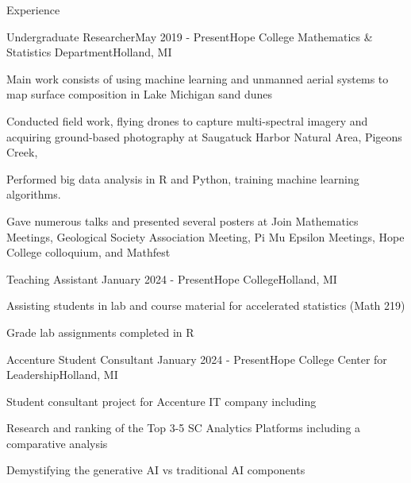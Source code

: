 \documentclass[
	11pt, %
]{resume} %
\begin{document}

\begin{rSection}{Experience}



  \begin{rSubsection}{Undergraduate Researcher}{May 2019 - Present}{Hope College Mathematics \& Statistics Department}{Holland, MI}
  \item Main work consists of using machine learning and unmanned aerial systems to map surface composition in Lake Michigan sand dunes
  \item Conducted field work, flying drones to capture multi-spectral imagery and acquiring  ground-based photography  at Saugatuck Harbor Natural Area, Pigeons Creek,
  \item Performed big data analysis in R and Python, training machine learning algorithms.
  \item Gave numerous talks and presented several posters at Join Mathematics Meetings, Geological Society Association Meeting, Pi Mu Epsilon Meetings, Hope College colloquium, and Mathfest
	\end{rSubsection}


\pagebreak
	\begin{rSubsection}{Teaching Assistant}{ January 2024 - Present}{Hope College}{Holland, MI}
    \item Assisting students in lab and course material for accelerated statistics (Math 219)
    \item Grade lab assignments completed in R
	\end{rSubsection}

	\begin{rSubsection}{Accenture Student Consultant}{ January 2024 - Present}{Hope College Center for Leadership}{Holland, MI}
    \item Student consultant project for Accenture IT company including
    \item Research and ranking of the Top 3-5 SC Analytics Platforms including a comparative analysis
    \item Demystifying the generative AI vs traditional AI components
	\end{rSubsection}



\end{rSection}
\end{document}
